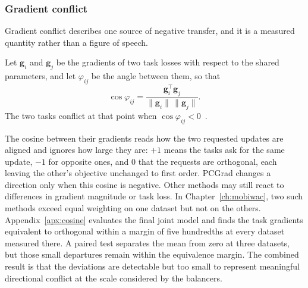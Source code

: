 \subsubsection{Gradient conflict}

Gradient conflict describes one source of negative transfer, and it is a measured
quantity rather than a figure of speech.

\begin{definition}\label{def:fund:conflict}
Let $\mathbf{g}_i$ and $\mathbf{g}_j$ be the gradients of two task losses with respect
to the shared parameters, and let $\varphi_{ij}$ be the angle between them, so that
\begin{equation}\label{eq:fund:cosine}
    \cos\varphi_{ij}
    = \frac{\mathbf{g}_i^{\top}\mathbf{g}_j}
           {\lVert \mathbf{g}_i\rVert\,\lVert \mathbf{g}_j\rVert}.
\end{equation}
The two tasks conflict at that point when $\cos\varphi_{ij}<0$~\cite{yu2020pcgrad}.
\end{definition}

The cosine between their gradients reads how the two requested updates are aligned and
ignores how large they are: $+1$ means the tasks ask for the same update, $-1$ for
opposite ones, and $0$ that the requests are orthogonal, each leaving the other's
objective unchanged to first order. PCGrad changes a direction only when this cosine is
negative. Other methods may still react to differences in gradient magnitude or task
loss. In Chapter~\ref{ch:mobiwac}, two such methods exceed equal weighting on one
dataset but not on the others. Appendix~\ref{apx:cosine} evaluates the final joint
model and finds the task gradients equivalent to orthogonal within a margin of five
hundredths at every dataset measured there. A paired test separates the mean from zero
at three datasets, but those small departures remain within the equivalence margin.
The combined result is that the deviations are detectable but too small to represent
meaningful directional conflict at the scale considered by the balancers.

